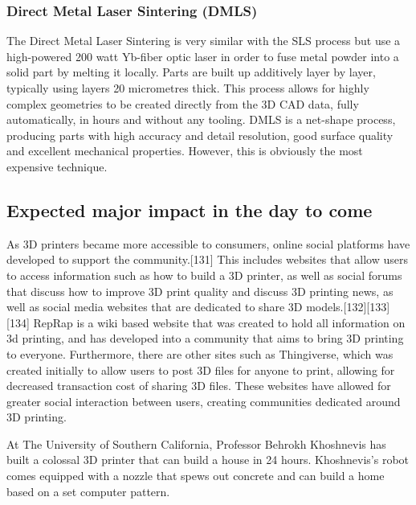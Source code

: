 \subsubsection{Direct Metal Laser Sintering (DMLS)} %

The Direct Metal Laser Sintering is very similar with the SLS process but use a high-powered 200 watt Yb-fiber optic laser in order to fuse metal powder into a solid part by melting it locally. Parts are built up additively layer by layer, typically using layers 20 micrometres thick. This process allows for highly complex geometries to be created directly from the 3D CAD data, fully automatically, in hours and without any tooling. DMLS is a net-shape process, producing parts with high accuracy and detail resolution, good surface quality and excellent mechanical properties. However, this is obviously the most expensive technique.

\begin{figure}[h]
    \centering
        \hfil
        \hfil
    \caption{}
    \label{fig:DMLS_technique}
\end{figure}


\subsection{Expected major impact in the day to come} %

As 3D printers became more accessible to consumers, online social platforms have developed to support the community.[131] This includes websites that allow users to access information such as how to build a 3D printer, as well as social forums that discuss how to improve 3D print quality and discuss 3D printing news, as well as social media websites that are dedicated to share 3D models.[132][133][134]
RepRap is a wiki based website that was created to hold all information on 3d printing, and has developed into a community that aims to bring 3D printing to everyone. Furthermore, there are other sites such as Thingiverse, which was created initially to allow users to post 3D files for anyone to print, allowing for decreased transaction cost of sharing 3D files. These websites have allowed for greater social interaction between users, creating communities dedicated around 3D printing.

At The University of Southern California, Professor Behrokh Khoshnevis has built a colossal 3D printer that can build a house in 24 hours. Khoshnevis's robot comes equipped with a nozzle that spews out concrete and can build a home based on a set computer pattern.



